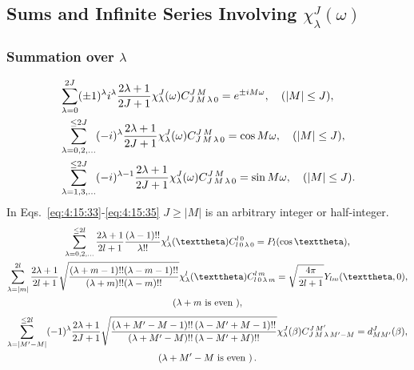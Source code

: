\subsection{Sums and Infinite Series Involving $\chi_{\lambda}^{J}(\omega)$}\label{sec:4.15.7}
\subsubsection{ Summation over $\lambda$}
\begin{align}
& \sum_{\lambda=0}^{2 J}( \pm 1)^{\lambda} i^{\lambda} \frac{2 \lambda+1}{2 J+1} \chi_{\lambda}^{J}(\omega) C_{J\,M\,\lambda\,0}^{J\,M}=e^{ \pm i M \omega}, \quad(|M| \leq J) , \label{eq:4:15:33}\\
& \sum_{\lambda=0,2, \ldots}^{\leq 2 J}(-i)^{\lambda} \frac{2 \lambda+1}{2 J+1} \chi_{\lambda}^{J}(\omega) C_{J\,M\,\lambda\,0}^{J\,M}=\cos M \omega, \quad(|M| \leq J)  ,\label{eq:4:15:34}\\
& \sum_{\lambda=1,3, \ldots}^{\leq 2 J}(-i)^{\lambda-1} \frac{2 \lambda+1}{2 J+1} \chi_{\lambda}^{J}(\omega) C_{J\,M\,\lambda\,0}^{J\,M}=\sin M \omega, \quad(|M| \leq J). \label{eq:4:15:35}
\end{align}
In Eqs.~\eqref{eq:4:15:33}-\eqref{eq:4:15:35} $J \geq|M|$ is an arbitrary integer or half-integer.
\begin{gather}
\sum_{\lambda=0,2, \ldots}^{\leq 2 l} \frac{2 \lambda+1}{2 l+1} \frac{(\lambda-1)!!}{\lambda!!} \chi_{\lambda}^{l}(\vartheta) \clebsch{l}{0}{\lambda}{0}{l}{0}=P_{l}(\cos \vartheta),  \label{eq:4:15:36}\\
\sum_{\lambda=|m|}^{2 l} \frac{2 \lambda+1}{2 l+1} \sqrt{\frac{(\lambda+m-1)!!(\lambda-m-1)!!}{(\lambda+m)!!(\lambda-m)!!}} \chi_{\lambda}^{l}(\vartheta) \clebsch{l}{0}{\lambda}{m}{l}{m}=\sqrt{\frac{4 \pi}{2 l+1}} Y_{l m}(\vartheta, 0),  \label{eq:4:15:37}\\
(\lambda+m \text { is even }),  \notag
\end{gather}\begin{gather}
\sum_{\lambda=\left|M^{\prime}-M\right|}^{\leq 2 l}(-1)^{\lambda} \frac{2 \lambda+1}{2 J+1} \sqrt{\frac{\left(\lambda+M^{\prime}-M-1\right)!!\left(\lambda-M^{\prime}+M-1\right)!!}{\left(\lambda+M^{\prime}-M\right)!!\left(\lambda-M^{\prime}+M\right)!!}} \chi_{\lambda}^{J}(\beta) C_{J\,M\,\lambda\,M^{\prime}-M}^{J\,M^{\prime}}=d_{M M^{\prime}}^{J}(\beta),  \label{eq:4:15:38}\\
\left(\lambda+M^{\prime}-M \text { is even }\right) .  \notag
\end{gather}
